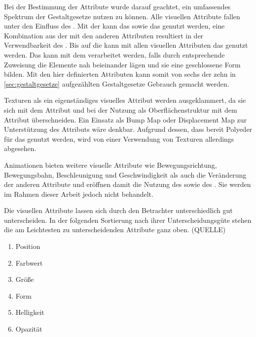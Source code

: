 Bei der Bestimmung der Attribute wurde darauf geachtet, ein umfassendes Spektrum der Gestaltgesetze nutzen zu können. Alle visuellen Attribute fallen unter den Einfluss des . Mit der  kann das  sowie das  genutzt werden, eine Kombination aus der  mit den anderen Attributen resultiert in der Verwendbarkeit des . Bis auf die  kann mit allen visuellen Attributen das  genutzt werden. Das  kann mit dem  verarbeitet werden, falls durch entsprechende Zuweisung die Elemente nah beieinander lägen und sie eine geschlossene Form bilden. Mit den hier definierten Attributen kann somit von sechs der zehn in \autoref{sec:gestaltgesetze} aufgezählten Gestaltgesetze Gebrauch gemacht werden.

Texturen als ein eigenständiges visuelles Attribut werden ausgeklammert, da sie sich mit dem Attribut  und bei der Nutzung als Oberflächenstruktur mit dem Attribut  überschneiden. Ein Einsatz als Bump Map oder Displacement Map zur Unterstützung des Attributs  wäre denkbar. Aufgrund dessen, dass bereit Polyeder für das  genutzt werden, wird von einer Verwendung von Texturen allerdings abgesehen.

Animationen bieten weitere visuelle Attribute wie Bewegungsrichtung, Bewegungsbahn, Beschleunigung und Geschwindigkeit als auch die Veränderung der anderen Attribute und eröffnen damit die Nutzung des  sowie des . Sie werden im Rahmen dieser Arbeit jedoch nicht behandelt.

Die visuellen Attribute lassen sich durch den Betrachter unterschiedlich gut unterscheiden. In der folgenden Sortierung nach ihrer Unterscheidungsgüte stehen die am Leichtesten zu unterscheidenden Attribute ganz oben. (QUELLE)
\begin{enumerate}
	\item Position
	\item Farbwert
	\item Größe
	\item Form
	\item Helligkeit
	\item Opazität
\end{enumerate}


